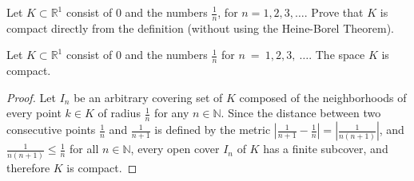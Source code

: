 \setcounter{exercise}{11}
\begin{exercise}
	Let $K \subset \mathbb{R}^1$ consist of $0$ and the numbers $\frac{1}{n}$, for $n = 1, 2, 3, \ldots$. Prove that $K$ is compact directly from the definition (without using the Heine-Borel Theorem).
\end{exercise}
\begin{proposition}
	Let $K \subset \mathbb{R}^1$ consist of $0$ and the numbers $\frac{1}{n}$ for $n~=~1, 2, 3,~\ldots$. The space $K$ is compact.
\end{proposition}
\begin{proof}
	Let $I_n$ be an arbitrary covering set of $K$ composed of the neighborhoods of every point $k \in K$ of radius $\frac{1}{n}$ for any $n \in \mathbb{N}$. Since the distance between two consecutive points $\frac{1}{n}$ and $\frac{1}{n+1}$ is defined by the metric $\left| \frac{1}{n+1} - \frac{1}{n} \right| = \left| \frac{1}{n(n+1)} \right|$, and $\frac{1}{n(n+1)} \leq \frac{1}{n}$ for all $n \in \mathbb{N}$, every open cover $I_n$ of $K$ has a finite subcover, and therefore $K$ is compact.
\end{proof}
